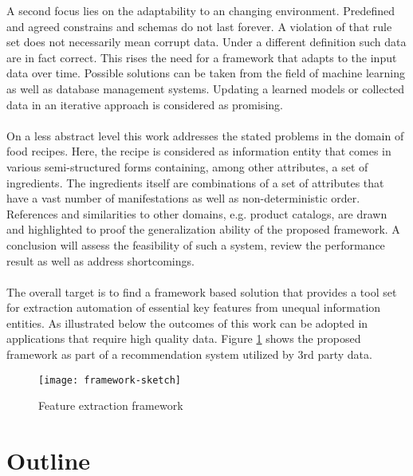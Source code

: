 A second focus lies on the adaptability to an changing environment. Predefined and agreed constrains and schemas do not last forever. A violation of that rule set does not necessarily mean corrupt data. Under a different definition such data are in fact correct. This rises the need for a framework that adapts to the input data over time. Possible solutions can be taken from the field of machine learning as well as database management systems. Updating a learned models or collected data in an iterative approach is considered as promising. 
\\\\
On a less abstract level this work addresses the stated problems in the domain of food recipes. Here, the recipe is considered as information entity that comes in various semi-structured forms containing, among other attributes, a set of ingredients. The ingredients itself are combinations of a  set of attributes that have a vast number of manifestations as well as non-deterministic order. References and similarities to other domains, e.g. product catalogs, are drawn and highlighted to proof the generalization ability of the proposed framework. A conclusion will assess the feasibility of such a system, review the performance result as well as address shortcomings.
\\\\
The overall target is to find a framework based solution that provides a tool set for extraction automation of essential key features from unequal information entities. As illustrated below the outcomes of this work can be adopted in applications that require high quality data. Figure \ref{fig:framework-sketch} shows the proposed framework as part of a recommendation system utilized by 3rd party data.
\\
\begin{figure}[htb]
  \centering
  \texttt{[image: framework-sketch]}\\
  \caption{Feature extraction framework}\label{fig:framework-sketch}
\end{figure}

\section{Outline\label{sec:outline}}

